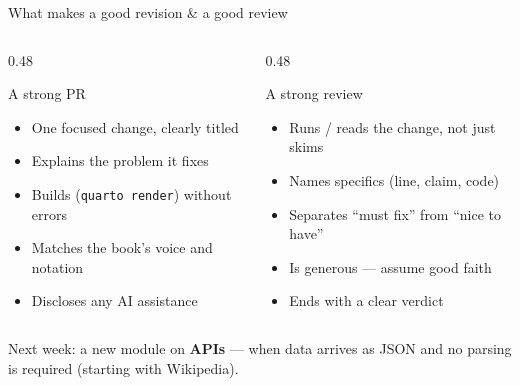 \documentclass[9pt,aspectratio=169]{beamer}
\begin{document}
\begin{frame}{What makes a good revision \& a good review}
    \begin{columns}[T]
        \begin{column}{0.48\textwidth}
            \begin{block}{A strong PR}
                \begin{itemize}\small
                    \item One focused change, clearly titled
                    \item Explains the problem it fixes
                    \item Builds (\texttt{quarto render}) without errors
                    \item Matches the book's voice and notation
                    \item Discloses any AI assistance
                \end{itemize}
            \end{block}
        \end{column}
        \begin{column}{0.48\textwidth}
            \begin{block}{A strong review}
                \begin{itemize}\small
                    \item Runs / reads the change, not just skims
                    \item Names specifics (line, claim, code)
                    \item Separates ``must fix'' from ``nice to have''
                    \item Is generous --- assume good faith
                    \item Ends with a clear verdict
                \end{itemize}
            \end{block}
        \end{column}
    \end{columns}
    \vspace{0.5em}
    \centering\small Next week: a new module on \textbf{APIs} --- when data arrives as JSON and no parsing is required (starting with Wikipedia).
\end{frame}
\end{document}
